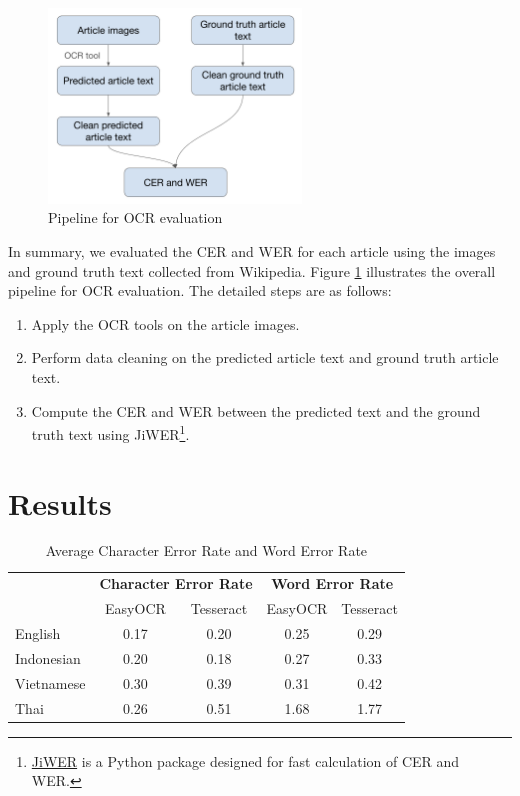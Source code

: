 \documentclass[12pt,oneside]{memoir}
\begin{document}
\begin{figure}[ht]
    \centering
    \includegraphics[width=0.6\textwidth]{images/ocr-evaluation.png}
    \caption{Pipeline for OCR evaluation}
    \label{figure:ocr-evaluation}
\end{figure}

In summary, we evaluated the CER and WER for each article using the images and 
ground truth text collected from Wikipedia. Figure \ref{figure:ocr-evaluation} 
illustrates the overall pipeline for OCR evaluation. The detailed steps are as follows:

\begin{enumerate}
    \item Apply the OCR tools on the article images.
    \item Perform data cleaning on the predicted article text and ground truth article text.
    \item Compute the CER and WER between the predicted text and the ground truth text using JiWER\footnote{\href{https://pypi.org/project/jiwer/}{JiWER} is a Python package designed for fast calculation of CER and WER.}.
\end{enumerate}

\chapter{Results}

\begin{table}[ht]
    \centering
    \begin{tabular}{lcccc}
        \toprule
        & \multicolumn{2}{c}{\textbf{Character Error Rate}} & \multicolumn{2}{c}{\textbf{Word Error Rate}}\\
        \cmidrule(lr){2-3}\cmidrule(lr){4-5}
        & EasyOCR & Tesseract & EasyOCR & Tesseract\\
        \midrule
        English & 0.17 & 0.20 & 0.25 & 0.29\\
        Indonesian & 0.20 & 0.18 & 0.27 & 0.33\\
        Vietnamese & 0.30 & 0.39 & 0.31 & 0.42\\
        Thai & 0.26 & 0.51 & 1.68 & 1.77\\
        \bottomrule
    \end{tabular}
    \caption{Average Character Error Rate and Word Error Rate}
    \label{table:results}
\end{table}
\end{document}
